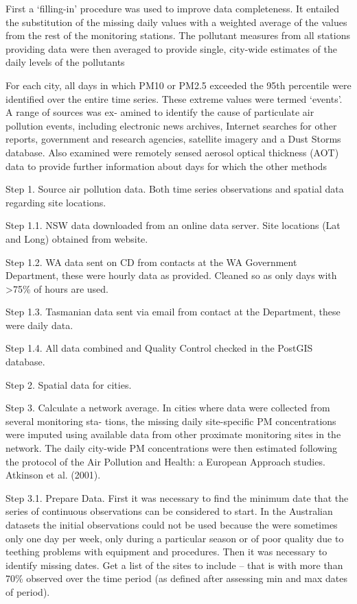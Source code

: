 First a `filling-in' procedure was used to improve data completeness. It
entailed the substitution of the missing daily values with a weighted
average of the values from the rest of the monitoring stations. The
pollutant measures from all stations providing data were then averaged
to provide single, city-wide estimates of the daily levels of the
pollutants

For each city, all days in which PM10 or PM2.5 exceeded the 95th
percentile were identified over the entire time series. These extreme
values were termed `events'. A range of sources was ex- amined to
identify the cause of particulate air pollution events, including
electronic news archives, Internet searches for other reports,
government and research agencies, satellite imagery and a Dust Storms
database. Also examined were remotely sensed aerosol optical thickness
(AOT) data to provide further information about days for which the other
methods

Step 1. Source air pollution data. Both time series observations and
spatial data regarding site locations.

Step 1.1. NSW data downloaded from an online data server. Site locations
(Lat and Long) obtained from website.

Step 1.2. WA data sent on CD from contacts at the WA Government
Department, these were hourly data as provided. Cleaned so as only days
with \textgreater{}75\% of hours are used.

Step 1.3. Tasmanian data sent via email from contact at the Department,
these were daily data.

Step 1.4. All data combined and Quality Control checked in the PostGIS
database.

Step 2. Spatial data for cities.

Step 3. Calculate a network average. In cities where data were collected
from several monitoring sta- tions, the missing daily site-specific PM
concentrations were imputed using available data from other proximate
monitoring sites in the network. The daily city-wide PM concentrations
were then estimated following the protocol of the Air Pollution and
Health: a European Approach studies. Atkinson et al. (2001).

Step 3.1. Prepare Data. First it was necessary to find the minimum date
that the series of continuous observations can be considered to start.
In the Australian datasets the initial observations could not be used
because the were sometimes only one day per week, only during a
particular season or of poor quality due to teething problems with
equipment and procedures. Then it was necessary to identify missing
dates. Get a list of the sites to include -- that is with more than 70\%
observed over the time period (as defined after assessing min and max
dates of period).

